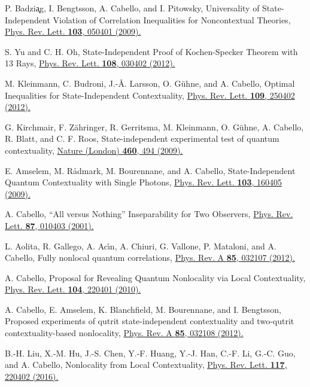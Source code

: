 \documentclass[%
 twocolumn,
 groupedaddress,
 showpacs,
 showkeys,
 preprintnumbers,
 amsmath,amssymb,
 aps,
 pra,
 longbibliography,
 floatfix,
 ]{revtex4-1}
\begin{document}
\begin{thebibliography}{99}
P. Badzi{\c a}g, I. Bengtsson, A. Cabello, and I. Pitowsky,
Universality of State-Independent Violation of Correlation Inequalities for Noncontextual Theories,
\href{https://doi.org/10.1103/PhysRevLett.103.050401}{Phys. Rev. Lett. \textbf{103}, 050401 (2009).}

S. Yu and C. H. Oh,
State-Independent Proof of Kochen-Specker Theorem with 13 Rays,
\href{http://dx.doi.org/10.1103/PhysRevLett.108.030402}{Phys. Rev. Lett. \textbf{108}, 030402 (2012).}

M. Kleinmann, C. Budroni, J.-\AA. Larsson, O. G{\"u}hne, and A. Cabello,
Optimal Inequalities for State-Independent Contextuality,
\href{http://dx.doi.org/10.1103/PhysRevLett.109.250402}{Phys. Rev. Lett. \textbf{109}, 250402 (2012).}

G. Kirchmair, F. Z\"{a}hringer, R. Gerritsma, M. Kleinmann, O. G\"{u}hne, A. Cabello, R. Blatt, and C. F. Roos,
State-independent experimental test of quantum contextuality,
\href{https://doi.org/10.1038/nature08172}{Nature (London) \textbf{460}, 494 (2009).}

E. Amselem, M. R{\aa}dmark, M. Bourennane, and A. Cabello,
State-Independent Quantum Contextuality with Single Photons,
\href{https://doi.org/10.1103/PhysRevLett.103.160405}{Phys. Rev. Lett. \textbf{103}, 160405 (2009).}

A. Cabello,
``All versus Nothing'' Inseparability for Two Observers,
\href{https://doi.org/10.1103/PhysRevLett.87.010403}{Phys. Rev. Lett. \textbf{87}, 010403 (2001).}

L. Aolita, R. Gallego, A. Ac\'{\i}n, A. Chiuri, G. Vallone, P. Mataloni, and A. Cabello,
Fully nonlocal quantum correlations,
\href{https://doi.org/10.1103/PhysRevA.85.032107}{Phys. Rev. A \textbf{85}, 032107 (2012).}

A. Cabello,
Proposal for Revealing Quantum Nonlocality via Local Contextuality,
\href{http://link.aps.org/doi/10.1103/PhysRevLett.104.220401}{Phys. Rev. Lett. \textbf{104}, 220401 (2010).}

A. Cabello, E. Amselem, K. Blanchfield, M. Bourennane, and I. Bengtsson, 
Proposed experiments of qutrit state-independent contextuality and two-qutrit contextuality-based nonlocality,
\href{https://doi.org/10.1103/PhysRevA.85.032108}{Phys. Rev. A \textbf{85}, 032108 (2012).}

B.-H. Liu, X.-M. Hu, J.-S. Chen, Y.-F. Huang, Y.-J. Han, C.-F. Li, G.-C. Guo, and A. Cabello,
Nonlocality from Local Contextuality,
\href{https://doi.org/10.1103/PhysRevLett.117.220402}{Phys. Rev. Lett. \textbf{117}, 220402 (2016).}


\end{thebibliography}
\end{document}
